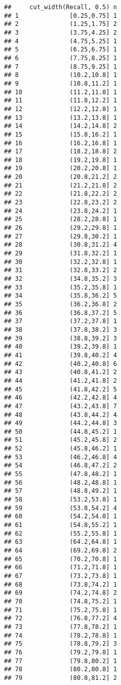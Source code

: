 \documentclass[
]{article}
\begin{document}
\begin{verbatim}
##     cut_width(Recall, 0.5) n
## 1              [0.25,0.75] 1
## 2              (1.25,1.75] 2
## 3              (3.75,4.25] 2
## 4              (4.75,5.25] 1
## 5              (6.25,6.75] 1
## 6              (7.75,8.25] 1
## 7              (8.75,9.25] 1
## 8              (10.2,10.8] 1
## 9              (10.8,11.2] 1
## 10             (11.2,11.8] 1
## 11             (11.8,12.2] 1
## 12             (12.2,12.8] 1
## 13             (13.2,13.8] 1
## 14             (14.2,14.8] 2
## 15             (15.8,16.2] 1
## 16             (16.2,16.8] 1
## 17             (18.2,18.8] 2
## 18             (19.2,19.8] 1
## 19             (20.2,20.8] 1
## 20             (20.8,21.2] 2
## 21             (21.2,21.8] 2
## 22             (21.8,22.2] 2
## 23             (22.8,23.2] 2
## 24             (23.8,24.2] 1
## 25             (28.2,28.8] 1
## 26             (29.2,29.8] 1
## 27             (29.8,30.2] 1
## 28             (30.8,31.2] 4
## 29             (31.8,32.2] 1
## 30             (32.2,32.8] 1
## 31             (32.8,33.2] 2
## 32             (34.8,35.2] 3
## 33             (35.2,35.8] 1
## 34             (35.8,36.2] 5
## 35             (36.2,36.8] 2
## 36             (36.8,37.2] 5
## 37             (37.2,37.8] 1
## 38             (37.8,38.2] 3
## 39             (38.8,39.2] 3
## 40             (39.2,39.8] 1
## 41             (39.8,40.2] 4
## 42             (40.2,40.8] 6
## 43             (40.8,41.2] 2
## 44             (41.2,41.8] 2
## 45             (41.8,42.2] 5
## 46             (42.2,42.8] 4
## 47             (43.2,43.8] 7
## 48             (43.8,44.2] 4
## 49             (44.2,44.8] 3
## 50             (44.8,45.2] 1
## 51             (45.2,45.8] 2
## 52             (45.8,46.2] 1
## 53             (46.2,46.8] 4
## 54             (46.8,47.2] 2
## 55             (47.8,48.2] 1
## 56             (48.2,48.8] 1
## 57             (48.8,49.2] 1
## 58             (53.2,53.8] 1
## 59             (53.8,54.2] 4
## 60             (54.2,54.8] 1
## 61             (54.8,55.2] 1
## 62             (55.2,55.8] 1
## 63             (64.2,64.8] 1
## 64             (69.2,69.8] 2
## 65             (70.2,70.8] 1
## 66             (71.2,71.8] 1
## 67             (73.2,73.8] 1
## 68             (73.8,74.2] 1
## 69             (74.2,74.8] 2
## 70             (74.8,75.2] 1
## 71             (75.2,75.8] 1
## 72             (76.8,77.2] 4
## 73             (77.8,78.2] 1
## 74             (78.2,78.8] 1
## 75             (78.8,79.2] 3
## 76             (79.2,79.8] 1
## 77             (79.8,80.2] 1
## 78             (80.2,80.8] 1
## 79             (80.8,81.2] 2

\end{verbatim}
\end{document}
